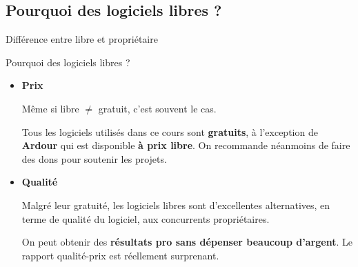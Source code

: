 \documentclass{beamer}
\begin{document}
\subsection{Pourquoi des logiciels libres ?}
\begin{frame}{Différence entre libre et propriétaire}
\end{frame}


\begin{frame}{Pourquoi des logiciels libres ?}
  \begin{itemize}
  \item \textbf{Prix}
  
    Même si libre $\neq$ gratuit, c'est souvent le cas.
    
    Tous les logiciels utilisés dans ce cours sont \textbf{gratuits}, à l'exception de \textbf{Ardour} qui est disponible \textbf{à prix libre}. On recommande néanmoins de faire des dons pour soutenir les projets.
    
  \item \textbf{Qualité}
    
    Malgré leur gratuité, les logiciels libres sont d'excellentes alternatives, en terme de qualité du logiciel, aux concurrents propriétaires.
    
    On peut obtenir des \textbf{résultats pro sans dépenser beaucoup d'argent}. Le rapport qualité-prix est réellement surprenant.
  \end{itemize}
\end{frame}
\end{document}

